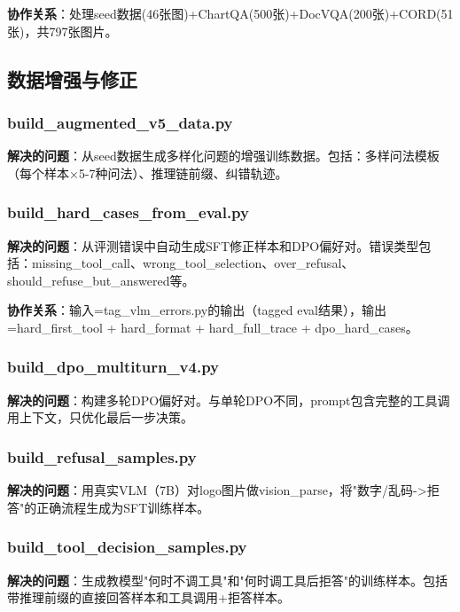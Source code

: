 \documentclass[fontset=none,11pt,a4paper]{ctexart}
\begin{document}
\textbf{协作关系}：处理seed数据(46张图)+ChartQA(500张)+DocVQA(200张)+CORD(51张)，共797张图片。

\subsection{数据增强与修正}

\subsubsection{build\_augmented\_v5\_data.py}

\textbf{解决的问题}：从seed数据生成多样化问题的增强训练数据。包括：多样问法模板（每个样本×5-7种问法）、推理链前缀、纠错轨迹。

\subsubsection{build\_hard\_cases\_from\_eval.py}

\textbf{解决的问题}：从评测错误中自动生成SFT修正样本和DPO偏好对。错误类型包括：missing\_tool\_call、wrong\_tool\_selection、over\_refusal、should\_refuse\_but\_answered等。

\textbf{协作关系}：输入=tag\_vlm\_errors.py的输出（tagged eval结果），输出=hard\_first\_tool + hard\_format + hard\_full\_trace + dpo\_hard\_cases。

\subsubsection{build\_dpo\_multiturn\_v4.py}

\textbf{解决的问题}：构建多轮DPO偏好对。与单轮DPO不同，prompt包含完整的工具调用上下文，只优化最后一步决策。

\subsubsection{build\_refusal\_samples.py}

\textbf{解决的问题}：用真实VLM（7B）对logo图片做vision\_parse，将"数字/乱码->拒答"的正确流程生成为SFT训练样本。

\subsubsection{build\_tool\_decision\_samples.py}

\textbf{解决的问题}：生成教模型"何时不调工具"和"何时调工具后拒答"的训练样本。包括带推理前缀的直接回答样本和工具调用+拒答样本。
\end{document}
